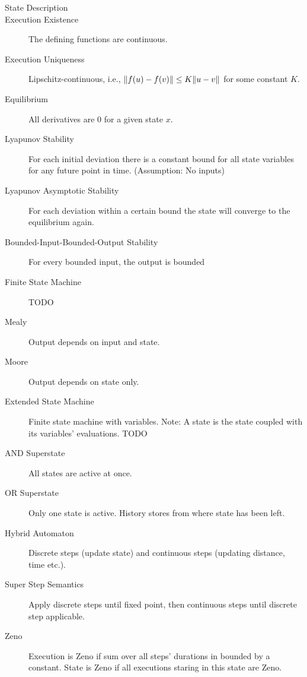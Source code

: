 



\begin{description}
	\item[State Description]
	\item[Execution Existence] The defining functions are continuous.
	\item[Execution Uniqueness] Lipschitz-continuous, i.e., $\Vert f(u) - f(v) \Vert 
	\leq K \Vert u - v \Vert$ for some constant $K$.
	\item[Equilibrium] All derivatives are 0 for a given state $x$.
	\item[Lyapunov Stability] For each initial deviation there is a constant 
	bound for all state variables for any future point in time. (Assumption: No
	inputs)
	\item[Lyapunov Asymptotic Stability] For each deviation within a certain bound
	the state will converge to the equilibrium again.
	\item[Bounded-Input-Bounded-Output Stability] For every bounded input, the output is bounded
	\item[Finite State Machine] TODO
	\item[Mealy] Output depends on input and state.
	\item[Moore] Output depends on state only.
	\item[Extended State Machine] Finite state machine with variables. Note: A
	state is the state coupled with its variables' evaluations. TODO
	\item[AND Superstate] All states are active at once.
	\item[OR Superstate] Only one state is active. History stores from where state
	has been left.
	\item[Hybrid Automaton] Discrete steps (\eg update state) and continuous steps
	(\eg updating distance, time etc.).
	\item[Super Step Semantics] Apply discrete steps until fixed point, then
	continuous steps until discrete step applicable.
	\item[Zeno] Execution is Zeno if sum over all steps' durations in bounded by a
	constant. State is Zeno if all executions staring in this state are Zeno.

\end{description}
